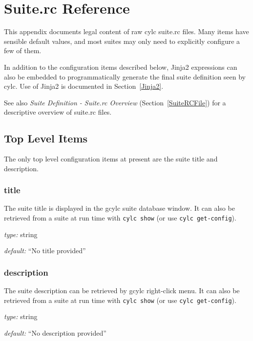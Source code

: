 \section{Suite.rc Reference}
\label{SuiteRCReference}

\lstset{language=bash}

This appendix documents legal content of raw cylc suite.rc files.
Many items have sensible default values, and most suites may only need to
explicitly configure a few of them.

In addition to the configuration items described below, Jinja2 expressions can
also be embedded to programmatically generate the final suite definition seen
by cylc.  Use of Jinja2 is documented in Section~\ref{Jinja2}.

See also {\em Suite Definition - Suite.rc Overview}
(Section~\ref{SuiteRCFile}) for a descriptive overview of suite.rc
files.

\subsection{Top Level Items}

The only top level configuration items at present are the suite title
and description.

\subsubsection{title}

The suite title is displayed in the gcylc suite database window. It can
also be retrieved from a suite at run time with \lstinline=cylc show= 
(or use \lstinline=cylc get-config=).

\begin{myitemize}
\item {\em type:} string 
\item {\em default:} ``No title provided''
\end{myitemize}

\subsubsection{description}

The suite description can be retrieved by gcylc right-click menu. It 
can also be retrieved from a suite at run time with 
\lstinline=cylc show= (or use \lstinline=cylc get-config=).

\begin{myitemize}
\item {\em type:} string
\item {\em default:} ``No description provided''
\end{myitemize}

